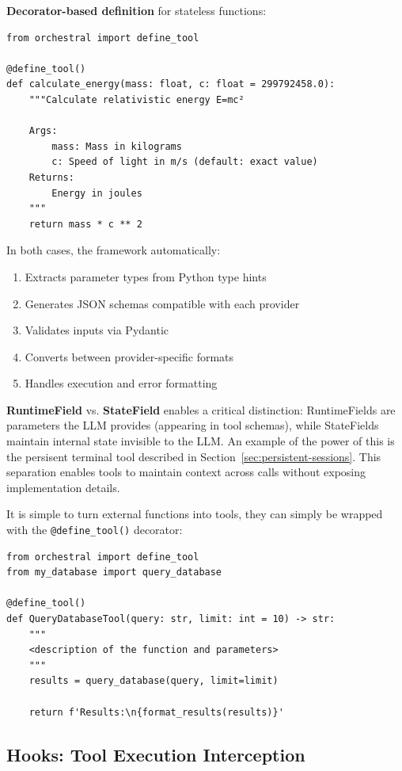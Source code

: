 \documentclass{article}
\begin{document}
\textbf{Decorator-based definition} for stateless functions:

\begin{verbatim}
from orchestral import define_tool

@define_tool()
def calculate_energy(mass: float, c: float = 299792458.0):
    """Calculate relativistic energy E=mc²

    Args:
        mass: Mass in kilograms
        c: Speed of light in m/s (default: exact value)
    Returns:
        Energy in joules
    """
    return mass * c ** 2
\end{verbatim}

In both cases, the framework automatically:
\begin{enumerate}
    \item Extracts parameter types from Python type hints
    \item Generates JSON schemas compatible with each provider
    \item Validates inputs via Pydantic
    \item Converts between provider-specific formats
    \item Handles execution and error formatting
\end{enumerate}

\textbf{RuntimeField} vs. \textbf{StateField} enables a critical distinction: RuntimeFields are parameters the LLM provides (appearing in tool schemas), while StateFields maintain internal state invisible to the LLM. An example of the power of this is the persisent terminal tool described in Section~\ref{sec:persistent-sessions}.
This separation enables tools to maintain context across calls without exposing implementation details.

It is simple to turn external functions into tools, they can simply be wrapped with the \texttt{@define\_tool()} decorator:

\begin{verbatim}
from orchestral import define_tool
from my_database import query_database

@define_tool()
def QueryDatabaseTool(query: str, limit: int = 10) -> str:
    """
    <description of the function and parameters>
    """
    results = query_database(query, limit=limit)

    return f'Results:\n{format_results(results)}'
\end{verbatim}

\subsection{Hooks: Tool Execution Interception}
\end{document}
